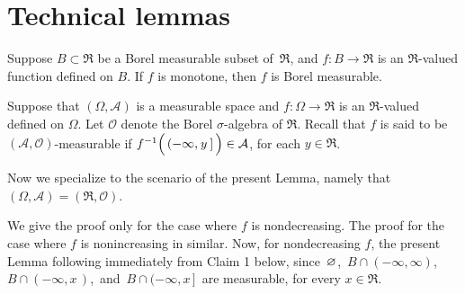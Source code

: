 

\section{Technical lemmas}
\setcounter{theorem}{0}
\setcounter{equation}{0}


\renewcommand{\theenumi}{\roman{enumi}}
\renewcommand{\labelenumi}{\textnormal{(\theenumi)}$\;\;$}


\begin{lemma}
\mbox{}\vskip 0.1cm
\noindent
Suppose $B \subset \Re$ be a Borel measurable subset of \,$\Re$, and
$f : B \longrightarrow \Re$ is an $\Re$-valued function defined on $B$.
If $f$ is monotone, then $f$ is Borel measurable.
\end{lemma}
\proof
Suppose that $(\Omega,\mathcal{A})$ is a measurable space and
$f : \Omega \longrightarrow \Re$ is an $\Re$-valued defined on $\Omega$.
Let $\mathcal{O}$ denote the Borel $\sigma$-algebra of $\Re$.
Recall that $f$ is said to be $(\mathcal{A},\mathcal{O})$-measurable if
$f^{-1}\!\left(\,(-\infty,\overset{{\color{white}-}}{y}\,]\,\right) \in \mathcal{A}$,
for each $y \in \Re$.

\vskip 0.3cm
\noindent
Now we specialize to the scenario of the present Lemma, namely that
$(\Omega,\mathcal{A}) = (\Re,\mathcal{O})$.

\vskip 0.3cm
\noindent
We give the proof only for the case where $f$ is nondecreasing.
The proof for the case where $f$ is nonincreasing in similar.
Now, for nondecreasing $f$, the present Lemma following immediately
from Claim 1 below, since \,$\varnothing$, \,$B \cap (-\infty,\infty)$,
\,$B \cap (-\infty,x\,)$,\, and \,$B \cap (-\infty,x\,]$\, are measurable, for every $x\in\Re$.


